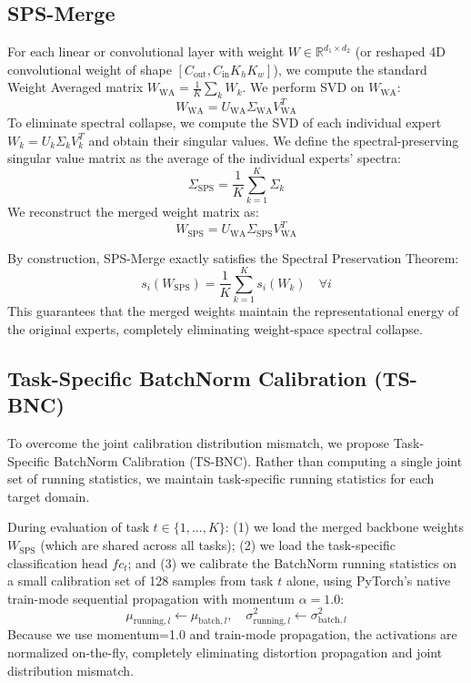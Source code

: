 \documentclass{article}
\theoremstyle{plain}
\theoremstyle{definition}
\theoremstyle{remark}
\begin{document}
\subsection{SPS-Merge}
For each linear or convolutional layer with weight $W \in \mathbb{R}^{d_1 \times d_2}$ (or reshaped 4D convolutional weight of shape $[C_{\text{out}}, C_{\text{in}} K_h K_w]$), we compute the standard Weight Averaged matrix $W_{\text{WA}} = \frac{1}{K}\sum_k W_k$.
We perform SVD on $W_{\text{WA}}$:
\begin{equation}
    W_{\text{WA}} = U_{\text{WA}} \Sigma_{\text{WA}} V_{\text{WA}}^T
\end{equation}
To eliminate spectral collapse, we compute the SVD of each individual expert $W_k = U_k \Sigma_k V_k^T$ and obtain their singular values. We define the spectral-preserving singular value matrix as the average of the individual experts' spectra:
\begin{equation}
    \Sigma_{\text{SPS}} = \frac{1}{K}\sum_{k=1}^K \Sigma_k
\end{equation}
We reconstruct the merged weight matrix as:
\begin{equation}
    W_{\text{SPS}} = U_{\text{WA}} \Sigma_{\text{SPS}} V_{\text{WA}}^T
\end{equation}

By construction, SPS-Merge exactly satisfies the Spectral Preservation Theorem:
\begin{equation}
    s_i(W_{\text{SPS}}) = \frac{1}{K}\sum_{k=1}^K s_i(W_k) \quad \forall i
\end{equation}
This guarantees that the merged weights maintain the representational energy of the original experts, completely eliminating weight-space spectral collapse.

\subsection{Task-Specific BatchNorm Calibration (TS-BNC)}
To overcome the joint calibration distribution mismatch, we propose Task-Specific BatchNorm Calibration (TS-BNC).
Rather than computing a single joint set of running statistics, we maintain task-specific running statistics for each target domain.

During evaluation of task $t \in \{1, \dots, K\}$: (1) we load the merged backbone weights $W_{\text{SPS}}$ (which are shared across all tasks); (2) we load the task-specific classification head $fc_t$; and (3) we calibrate the BatchNorm running statistics on a small calibration set of 128 samples from task $t$ alone, using PyTorch's native train-mode sequential propagation with momentum $\alpha = 1.0$:
\begin{equation}
    \mu_{\text{running}, l} \leftarrow \mu_{\text{batch}, l}, \quad \sigma^2_{\text{running}, l} \leftarrow \sigma^2_{\text{batch}, l}
\end{equation}
Because we use momentum=1.0 and train-mode propagation, the activations are normalized on-the-fly, completely eliminating distortion propagation and joint distribution mismatch.
\end{document}

